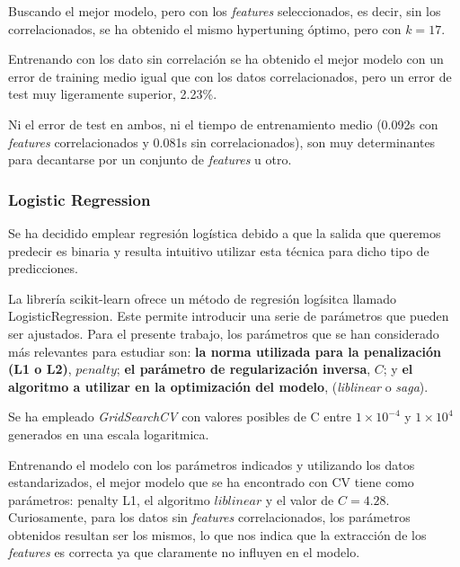 \documentclass[a4paper]{article} %
\begin{document}
Buscando el mejor modelo, pero con los \textit{features} seleccionados, es decir, sin los correlacionados, se ha obtenido el mismo hypertuning óptimo, pero con $k = 17$.\vspace{5mm}

Entrenando con los dato sin correlación se ha obtenido el mejor modelo con un error de training medio igual que con los datos correlacionados, pero un error de test muy ligeramente superior, 2.23\%.\vspace{5mm}

Ni el error de test en ambos, ni el tiempo de entrenamiento medio (0.092s con \textit{features} correlacionados y 0.081s sin correlacionados), son muy determinantes para decantarse por un conjunto de \textit{features} u otro.

\subsubsection{Logistic Regression}
Se ha decidido emplear regresión logística debido a que la salida que queremos predecir es binaria y resulta intuitivo utilizar esta técnica para dicho tipo de predicciones.\vspace{5mm}

La librería scikit-learn ofrece un método de regresión logísitca llamado LogisticRegression. Este permite introducir una serie de  parámetros que pueden ser ajustados. Para el presente trabajo, los parámetros que se han considerado más relevantes para estudiar son:\textbf{ la norma utilizada para la penalización (L1 o L2)}, $penalty$; \textbf{el parámetro de regularización inversa}, $C$; y \textbf{el algoritmo a utilizar en la optimización del modelo}, (\textit{liblinear} o \textit{saga}). \vspace{5mm}

Se ha empleado \textit{GridSearchCV} con valores posibles de C entre $1 \times 10^{-4}$ y $1 \times 10^{4}$ generados en una escala logaritmica.\vspace{5mm}

Entrenando el modelo con los parámetros indicados y utilizando los datos estandarizados, el mejor modelo que se ha encontrado con CV tiene como parámetros: penalty L1, el algoritmo $liblinear$ y el valor de $C = 4.28$. Curiosamente, para los datos sin \textit{features} correlacionados, los parámetros obtenidos resultan ser los mismos, lo que nos indica que la extracción de los \textit{features} es correcta ya que claramente no influyen en el modelo. \vspace{5mm}
\end{document}
